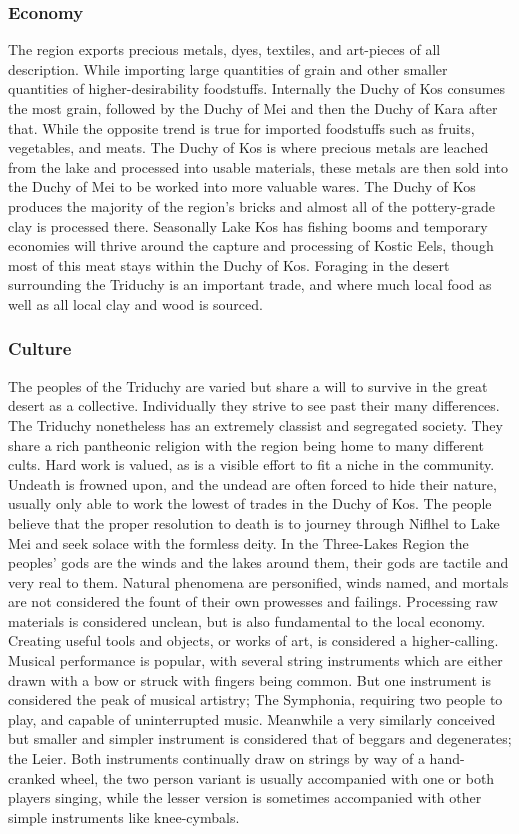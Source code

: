\subsubsection{Economy}
The region exports precious metals, dyes, textiles, and art-pieces of all description. 
While importing large quantities of grain and other smaller quantities of higher-desirability foodstuffs. 
Internally the Duchy of Kos consumes the most grain, followed by the Duchy of Mei and then the Duchy of Kara after that. 
While the opposite trend is true for imported foodstuffs such as fruits, vegetables, and meats. 
The Duchy of Kos is where precious metals are leached from the lake and processed into usable materials, these metals are then sold into the Duchy of Mei to be worked into more valuable wares. 
The Duchy of Kos produces the majority of the region’s bricks and almost all of the pottery-grade clay is processed there. 
Seasonally Lake Kos has fishing booms and temporary economies will thrive around the capture and processing of Kostic Eels, though most of this meat stays within the Duchy of Kos. 
Foraging in the desert surrounding the Triduchy is an important trade, and where much local food as well as all local clay and wood is sourced.

\subsubsection{Culture}
The peoples of the Triduchy are varied but share a will to survive in the great desert as a collective. 
Individually they strive to see past their many differences. 
The Triduchy nonetheless has an extremely classist and segregated society. 
They share a rich pantheonic religion with the region being home to many different cults. 
Hard work is valued, as is a visible effort to fit a niche in the community.
Undeath is frowned upon, and the undead are often forced to hide their nature, usually only able to work the lowest of trades in the Duchy of Kos. 
The people believe that the proper resolution to death is to journey through Niflhel to Lake Mei and seek solace with the formless deity. 
In the Three-Lakes Region the peoples’ gods are the winds and the lakes around them, their gods are tactile and very real to them. 
Natural phenomena are personified, winds named, and mortals are not considered the fount of their own prowesses and failings.
Processing raw materials is considered unclean, but is also fundamental to the local economy. 
Creating useful tools and objects, or works of art, is considered a higher-calling. 
Musical performance is popular, with several string instruments which are either drawn with a bow or struck with fingers being common. 
But one instrument is considered the peak of musical artistry; The Symphonia, requiring two people to play, and capable of uninterrupted music. 
Meanwhile a very similarly conceived but smaller and simpler instrument is considered that of beggars and degenerates; the Leier. 
Both instruments continually draw on strings by way of a hand-cranked wheel, the two person variant is usually accompanied with one or both players singing, while the lesser version is sometimes accompanied with other simple instruments like knee-cymbals.

